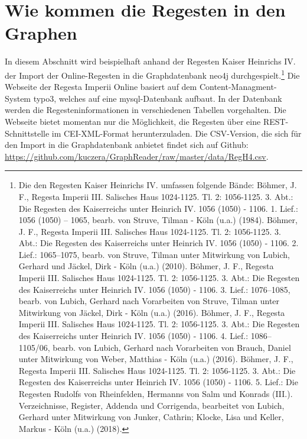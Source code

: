 \documentclass[ngerman,]{scrreprt}
\begin{document}
\hypertarget{wie-kommen-die-regesten-in-den-graphen}{%
\section{Wie kommen die Regesten in den Graphen}\label{wie-kommen-die-regesten-in-den-graphen}}

In diesem Abschnitt wird beispielhaft anhand der Regesten Kaiser Heinrichs IV. der Import der Online-Regesten in die Graphdatenbank neo4j durchgespielt.\footnote{Die den Regesten Kaiser Heinrichs IV. umfassen folgende Bände: Böhmer, J. F., Regesta Imperii III. Salisches Haus 1024-1125. Tl. 2: 1056-1125. 3. Abt.: Die Regesten des Kaiserreichs unter Heinrich IV. 1056 (1050) - 1106. 1. Lief.: 1056 (1050) -- 1065, bearb. von Struve, Tilman - Köln (u.a.) (1984). Böhmer, J. F., Regesta Imperii III. Salisches Haus 1024-1125. Tl. 2: 1056-1125. 3. Abt.: Die Regesten des Kaiserreichs unter Heinrich IV. 1056 (1050) - 1106. 2. Lief.: 1065--1075, bearb. von Struve, Tilman unter Mitwirkung von Lubich, Gerhard und Jäckel, Dirk - Köln (u.a.) (2010). Böhmer, J. F., Regesta Imperii III. Salisches Haus 1024-1125. Tl. 2: 1056-1125. 3. Abt.: Die Regesten des Kaiserreichs unter Heinrich IV. 1056 (1050) - 1106. 3. Lief.: 1076--1085, bearb. von Lubich, Gerhard nach Vorarbeiten von Struve, Tilman unter Mitwirkung von Jäckel, Dirk - Köln (u.a.) (2016). Böhmer, J. F., Regesta Imperii III. Salisches Haus 1024-1125. Tl. 2: 1056-1125. 3. Abt.: Die Regesten des Kaiserreichs unter Heinrich IV. 1056 (1050) - 1106. 4. Lief.: 1086--1105/06, bearb. von Lubich, Gerhard nach Vorarbeiten von Brauch, Daniel unter Mitwirkung von Weber, Matthias - Köln (u.a.) (2016). Böhmer, J. F., Regesta Imperii III. Salisches Haus 1024-1125. Tl. 2: 1056-1125. 3. Abt.: Die Regesten des Kaiserreichs unter Heinrich IV. 1056 (1050) - 1106. 5. Lief.: Die Regesten Rudolfs von Rheinfelden, Hermanns von Salm und Konrads (III.). Verzeichnisse, Register, Addenda und Corrigenda, bearbeitet von Lubich, Gerhard unter Mitwirkung von Junker, Cathrin; Klocke, Lisa und Keller, Markus - Köln (u.a.) (2018).} Die Webseite der Regesta Imperii Online basiert auf dem Content-Managment-System typo3, welches auf eine mysql-Datenbank aufbaut. In der Datenbank werden die Regesteninformationen in verschiedenen Tabellen vorgehalten. Die Webseite bietet momentan nur die Möglichkeit, die Regesten über eine REST-Schnittstelle im CEI-XML-Format herunterzuladen. Die CSV-Version, die sich für den Import in die Graphdatenbank anbietet findet sich auf Github: \url{https://github.com/kuczera/GraphReader/raw/master/data/RegH4.csv}.
\end{document}

